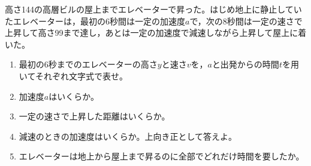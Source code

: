 \hakosyokika
\item 高さ144の高層ビルの屋上までエレベーターで昇った。はじめ地上に静止していたエレベーターは，最初の6秒間は一定の加速度$a$で，次の8秒間は一定の速さで上昇して高さ99まで達し，あとは一定の加速度で減速しながら上昇して屋上に着いた。
        \begin{enumerate}
            \item 最初の6秒までのエレベーターの高さ$y$と速さ$v$を，$a$と出発からの時間$t$を用いてそれぞれ文字式で表せ。
            \item 加速度$a$はいくらか。
            \item 一定の速さで上昇した距離はいくらか。
            \item 減速のときの加速度はいくらか。上向き正として答えよ。
            \item エレベーターは地上から屋上まで昇るのに全部でどれだけ時間を要したか。
        \end{enumerate}

